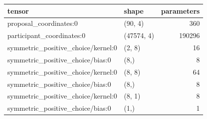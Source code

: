 \begin{tabular}{llr}
\toprule
tensor & shape & parameters \\
\midrule
proposal_coordinates:0 & (90, 4) & 360 \\
participant_coordinates:0 & (47574, 4) & 190296 \\
symmetric_positive_choice/kernel:0 & (2, 8) & 16 \\
symmetric_positive_choice/bias:0 & (8,) & 8 \\
symmetric_positive_choice/kernel:0 & (8, 8) & 64 \\
symmetric_positive_choice/bias:0 & (8,) & 8 \\
symmetric_positive_choice/kernel:0 & (8, 1) & 8 \\
symmetric_positive_choice/bias:0 & (1,) & 1 \\
\bottomrule
\end{tabular}
